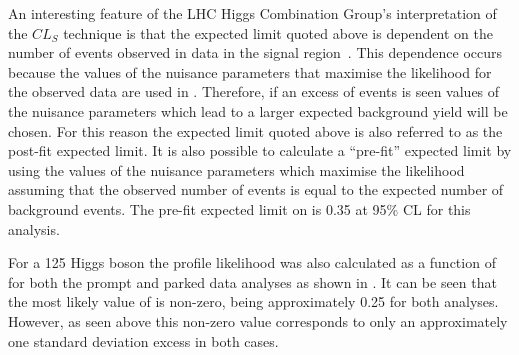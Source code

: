 An interesting feature of the LHC Higgs Combination Group's interpretation of the $CL_{S}$ technique is that the expected limit quoted above is dependent on the number of events observed in data in the signal region~\cite{ATL-PHYS-PUB-2011-011}. This dependence occurs because the values of the nuisance parameters that maximise the likelihood for the observed data are used in . Therefore, if an excess of events is seen values of the nuisance parameters which lead to a larger expected background yield will be chosen. For this reason the expected limit quoted above is also referred to as the post-fit expected limit. It is also possible to calculate a ``pre-fit'' expected limit by using the values of the nuisance parameters which maximise the likelihood assuming that the observed number of events is equal to the expected number of background events. The pre-fit expected limit on \BRinv is 0.35 at 95\% \ac{CL} for this analysis.

For a 125 \GeV Higgs boson the profile likelihood was also calculated as a function of \BRinv for both the prompt and parked data analyses as shown in . It can be seen that the most likely value of \BRinv is non-zero, being approximately 0.25 for both analyses. However, as seen above this non-zero value corresponds to only an approximately one standard deviation excess in both cases.

